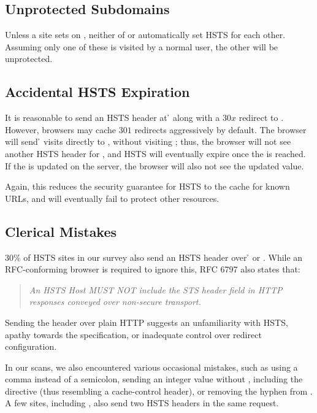 \documentclass{acm_proc_article-sp}
\begin{document}
\subsection{Unprotected Subdomains}

Unless a site sets {\iSD} on {\s}, neither of {\s} or {\sw} automatically set HSTS for each other. Assuming only one of these is visited by a normal user, the other will be unprotected.

\subsection{Accidental HSTS Expiration}

It is reasonable to send an HSTS header at {\h} along with a $30x$ redirect to {\sw}. However, browsers may cache $301$ redirects  aggressively by default. The browser will send {\h} visits directly to {\sw}, without visiting {\s}; thus, the browser will not see another HSTS header for {\s}, and HSTS will eventually expire once the {\ma} is reached. If the {\ma} is updated on the server, the browser will also not see the updated value.

Again, this reduces the security guarantee for HSTS to the cache for known URLs, and will eventually fail to protect other resources.

\subsection{Clerical Mistakes}

$30\%$ of HSTS sites in our survey also send an HSTS header over {\h} or {\hw}. While an RFC-conforming browser is required to ignore this, RFC 6797\cite{rfc} also states that:

\begin{quotation}\it
An HSTS Host MUST NOT include the STS header field in HTTP responses conveyed over non-secure transport.
\end{quotation}

Sending the header over plain HTTP suggests an unfamiliarity with HSTS, apathy towards the specification, or inadequate control over redirect configuration.

In our scans, we also encountered various occasional mistakes, such as using a comma instead of a semicolon, sending an integer value without , including the  directive (thus resembling a cache-control header), or removing the hyphen from . A few sites, including , also send two HSTS headers in the same request.
\end{document}
